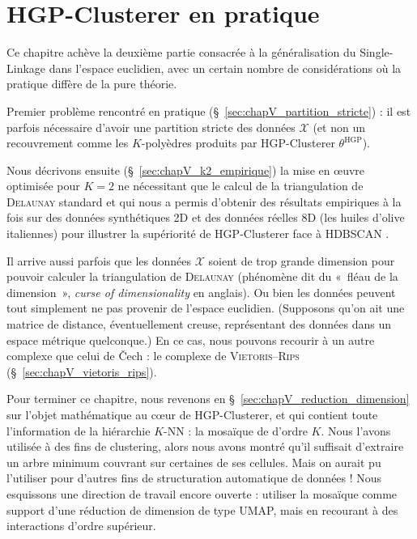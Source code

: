 \chapter{HGP-Clusterer en pratique}
\label{chap:conclusion_partie_II}


Ce chapitre achève la deuxième partie consacrée à la généralisation du Single-Linkage dans l'espace euclidien, avec un certain nombre de considérations où la pratique diffère de la pure théorie.

Premier problème rencontré en pratique (\S~\ref{sec:chapV_partition_stricte}) : il est parfois nécessaire d'avoir une partition stricte des données $\mathcal X$ (et non un recouvrement comme les $K$-polyèdres produits par HGP-Clusterer $\theta^{\mathrm{HGP}}$).

Nous décrivons ensuite (\S~\ref{sec:chapV_k2_empirique}) la mise en œuvre optimisée pour $K=2$ ne nécessitant que le calcul de la triangulation de \textsc{Delaunay} standard et qui nous a permis d'obtenir des résultats empiriques à la fois sur des données synthétiques 2D et des données réelles 8D (les huiles d'olive italiennes) pour illustrer la supériorité de HGP-Clusterer face à HDBSCAN \cite{BibiAppliedNetworkScience}. 

Il arrive aussi parfois que les données $\mathcal X$ soient de trop grande dimension pour pouvoir calculer la triangulation de \textsc{Delaunay} (phénomène dit du «~fléau de la dimension~», \emph{curse of dimensionality} \cite{Pestov2000CurseDimensionality} en anglais). Ou bien les données peuvent tout simplement ne pas provenir de l'espace euclidien. (Supposons qu'on ait une matrice de distance, éventuellement creuse, représentant des données dans un espace métrique quelconque.) En ce cas, nous pouvons recourir à un autre complexe que celui de \v Cech : le complexe de \textsc{Vietoris--Rips} (\S~\ref{sec:chapV_vietoris_rips}).

Pour terminer ce chapitre, nous revenons en \S~\ref{sec:chapV_reduction_dimension} sur l'objet mathématique au cœur de HGP-Clusterer, et qui contient toute l'information de la hiérarchie $K$-NN : la mosaïque de  d'ordre $K$.
Nous l'avons utilisée à des fins de clustering, alors nous avons montré qu'il suffisait d'extraire un arbre minimum couvrant sur certaines de ses cellules. Mais on aurait pu l'utiliser pour d'autres fins de structuration automatique de données !
Nous esquissons une direction de travail encore ouverte : utiliser la mosaïque comme support d'une réduction de dimension de type UMAP, mais en recourant à des interactions d'ordre supérieur.

